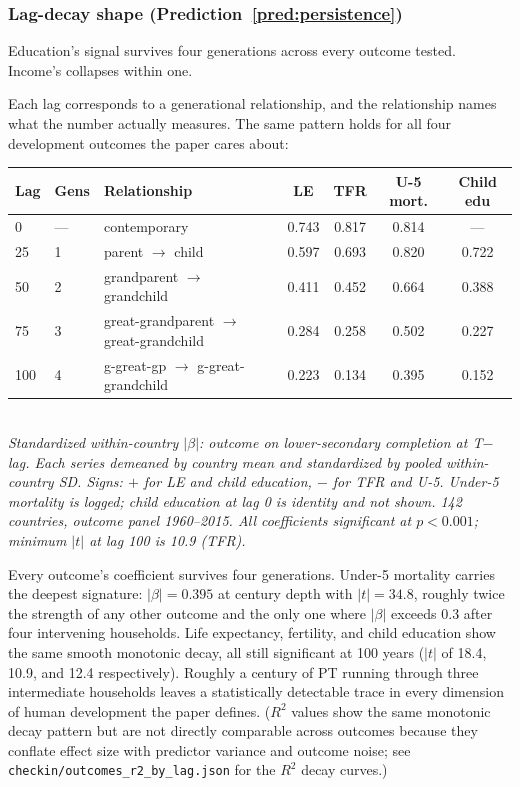 \documentclass[12pt,letterpaper]{article}
\begin{document}
\subsubsection*{Lag-decay shape (Prediction~\ref{pred:persistence})}

Education's signal survives four generations across every outcome
tested. Income's collapses within one.

Each lag corresponds to a generational relationship, and the
relationship names what the number actually measures. The same pattern
holds for all four development outcomes the paper cares about:

\begin{center}
\footnotesize
\begin{tabular}{@{}llp{4.4cm}cccc@{}}
\toprule
Lag & Gens & Relationship & LE & TFR & U-5 mort. & Child edu \\
\midrule
0   & ---  & contemporary                                 & 0.743 & 0.817 & 0.814 & --- \\
25  & 1    & parent $\to$ child                           & 0.597 & 0.693 & 0.820 & 0.722 \\
50  & 2    & grandparent $\to$ grandchild                 & 0.411 & 0.452 & 0.664 & 0.388 \\
75  & 3    & great-grandparent $\to$ great-grandchild     & 0.284 & 0.258 & 0.502 & 0.227 \\
100 & 4    & g-great-gp $\to$ g-great-grandchild          & 0.223 & 0.134 & 0.395 & 0.152 \\
\bottomrule
\end{tabular}\\
\textit{Standardized within-country $|\beta|$: outcome on lower-secondary
completion at T$-$lag. Each series demeaned by country mean and standardized
by pooled within-country SD. Signs: $+$ for LE and child education, $-$
for TFR and U-5. Under-5 mortality is logged; child education at lag 0 is
identity and not shown. 142 countries, outcome panel 1960--2015. All
coefficients significant at $p < 0.001$; minimum $|t|$ at lag 100 is
10.9 (TFR).}
\end{center}

Every outcome's coefficient survives four generations. Under-5 mortality
carries the deepest signature: $|\beta| = 0.395$ at century depth with
$|t| = 34.8$, roughly twice the strength of any other outcome and the
only one where $|\beta|$ exceeds 0.3 after four intervening households.
Life expectancy, fertility, and child education show the same smooth
monotonic decay, all still significant at 100 years ($|t|$ of 18.4,
10.9, and 12.4 respectively). Roughly a century of PT running through
three intermediate households leaves a statistically detectable trace
in every dimension of human development the paper defines. ($R^2$
values show the same monotonic decay pattern but are not directly
comparable across outcomes because they conflate effect size with
predictor variance and outcome noise; see
\texttt{checkin/outcomes\_r2\_by\_lag.json} for the $R^2$ decay
curves.)
\end{document}
